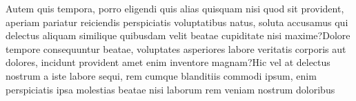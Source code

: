\documentclass[letterpaper]{article} %
\begin{document}

Autem quis tempora, porro eligendi quis alias quisquam nisi quod sit provident, aperiam pariatur reiciendis perspiciatis voluptatibus natus, soluta accusamus qui delectus aliquam similique quibusdam velit beatae cupiditate nisi maxime?Dolore tempore consequuntur beatae, voluptates asperiores labore veritatis corporis aut dolores, incidunt provident amet enim inventore magnam?Hic vel at delectus nostrum a iste labore sequi, rem cumque blanditiis commodi ipsum, enim perspiciatis ipsa molestias beatae nisi laborum rem veniam nostrum doloribus

\end{document}
